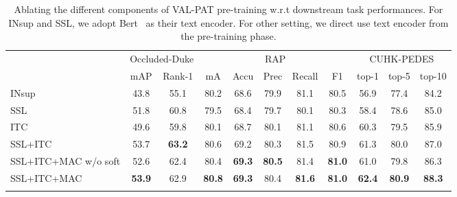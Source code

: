 \documentclass[final]{cvpr}
\begin{document}
\begin{table*}[tp]
\small
	\centering
\setlength{\tabcolsep}{3.3mm}
	\begin{tabular}{l|cc|ccccc|ccc}
\shline
		\multirow{2}{*}{pre-train} & \multicolumn{2}{c|}{Occluded-Duke} &  \multicolumn{5}{c|}{RAP} & \multicolumn{3}{c}{CUHK-PEDES} \\
		\cline{2-11} & mAP & Rank-1 & mA & Accu & Prec & Recall & F1 & top-1 & top-5 & top-10\\ 
		\hline
INsup  & 43.8 & 55.1 & 80.2 & 68.6 & 79.9 & 81.1 & 80.5 & 56.9 &  77.4 & 84.2   \\
		SSL  & 51.8 & 60.8 & 79.5 & 68.4 & 79.7 & 80.1 & 80.3 & 58.4 & 78.6 & 85.0   \\
		ITC  & 49.6 & 59.8 & 80.1 & 68.7 & 80.1 & 81.1 & 80.6 & 60.3 & 79.5  & 85.9  \\
		SSL+ITC        & 53.7 & \textbf{63.2} & 80.6 & 69.2 & 80.3 & 81.5 & 80.9 & 61.3 & 80.0 & 87.0 \\
		SSL+ITC+MAC \footnotesize{w/o soft}  & 52.6 & 62.4 & 80.4 & \textbf{69.3} & \textbf{80.5} & 81.4 & \textbf{81.0} & 61.0 & 79.8 & 86.3  \\
		SSL+ITC+MAC  & \textbf{53.9} & 62.9 & \textbf{80.8} & \textbf{69.3}  & 80.4 & \textbf{81.6} & \textbf{81.0} & \textbf{62.4} & \textbf{80.9}  & \textbf{88.3}  \\
		\shline
	\end{tabular}\\
	\vspace{-2mm}
	\caption{Ablating the different components of VAL-PAT pre-training w.r.t downstream task performances. 
		For INsup and SSL, we adopt Bert~\cite{devlin2018bert} as their text encoder.
		For other setting, we direct use text encoder from the pre-training phase.}
	\label{app:tab1}
\vspace{2mm}
\end{table*}
\end{document}
